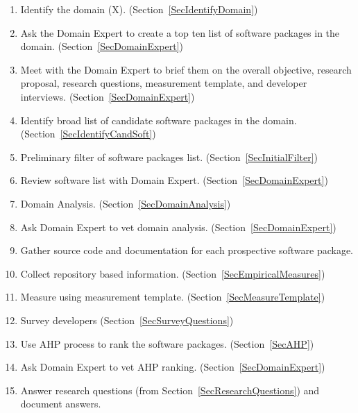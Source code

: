 \documentclass[letterpaper,cleveref]{lipics-v2019}
\newcommand{\authornote}[3]{\textcolor{#1}{[#3 ---#2]}}
\newcommand{\authornote}[3]{}
\newcommand{\wss}[1]{\authornote{blue}{SS}{#1}} %
\begin{document}
\begin{enumerate}
\item Identify the domain (X). (Section~\ref{SecIdentifyDomain})
\item Ask the Domain Expert to create a top ten list of software packages in the
  domain. (Section~\ref{SecDomainExpert})
\item Meet with the Domain Expert to brief them on the overall objective,
  research proposal, research questions, measurement template, and developer
  interviews. (Section~\ref{SecDomainExpert}) \label{StepMeeting}
\item Identify broad list of candidate software packages in the domain.
  (Section~\ref{SecIdentifyCandSoft})
\item Preliminary filter of software packages list.
  (Section~\ref{SecInitialFilter})
\item Review software list with Domain Expert. (Section~\ref{SecDomainExpert})
\item Domain Analysis. (Section~\ref{SecDomainAnalysis})
\item Ask Domain Expert to vet domain analysis.
  (Section~\ref{SecDomainExpert})
\item Gather source code and documentation for each prospective software
  package.
\item Collect repository based information. (Section~\ref{SecEmpiricalMeasures})
\item Measure using measurement template. (Section~\ref{SecMeasureTemplate})
\item Survey developers (Section~\ref{SecSurveyQuestions})
\item Use AHP process to rank the software packages. (Section~\ref{SecAHP})
\item Ask Domain Expert to vet AHP ranking. (Section~\ref{SecDomainExpert})
\item Answer research questions (from Section~\ref{SecResearchQuestions}) and
document answers.
\end{enumerate}

\end{document}
